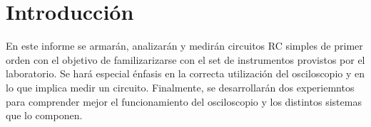 \section{Introducci\'on}

En este informe se armarán, analizarán y medirán circuitos RC simples de primer orden con el objetivo de familizarizarse con el set de instrumentos provistos por el laboratorio. Se hará especial énfasis en la correcta utilización del osciloscopio y en lo que implica medir un circuito. Finalmente, se desarrollarán dos experiemntos para comprender mejor el funcionamiento del osciloscopio y los distintos sistemas que lo componen.